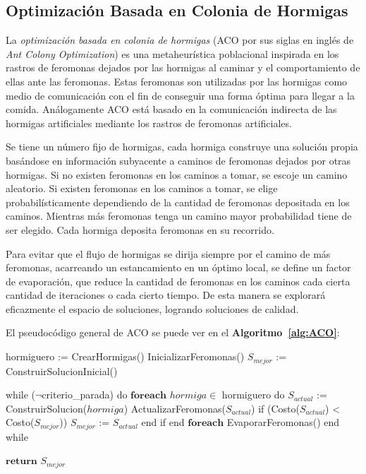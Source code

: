 \subsection{Optimización Basada en Colonia de Hormigas} \label{subsect:aco}

La \emph{optimización basada en colonia de hormigas} (ACO por sus siglas en inglés de \emph{Ant Colony Optimization}) es una metaheurística poblacional inspirada en los rastros de feromonas dejados por las hormigas al caminar y el comportamiento de ellas ante las feromonas. Estas feromonas son utilizadas por las hormigas como medio de comunicación con el fin de conseguir una forma óptima para llegar a la comida. Análogamente ACO está basado en la comunicación indirecta de las hormigas artificiales mediante los rastros de feromonas artificiales. 

Se tiene un número fijo de hormigas, cada hormiga construye una solución propia basándose en información subyacente a caminos de feromonas dejados por otras hormigas. Si no existen feromonas en los caminos a tomar, se escoje un camino aleatorio. Si existen feromonas en los caminos a tomar, se elige probabilísticamente dependiendo de la cantidad de feromonas depositada en los caminos. Mientras más feromonas tenga un camino mayor probabilidad tiene de ser elegido. Cada hormiga deposita feromonas en su recorrido. 

Para evitar que el flujo de hormigas se dirija siempre por el camino de más feromonas, acarreando un es\-tan\-ca\-mien\-to en un óptimo local, se define un factor de evaporación, que reduce la cantidad de  feromonas en los caminos cada cierta cantidad de iteraciones o cada cierto tiempo. De esta manera se explorará eficazmente el espacio de soluciones, logrando soluciones de calidad.

El pseudocódigo general de ACO se puede ver en el \textbf{Algoritmo~\ref{alg:ACO}}:

\begin{code}[includerangemarker=false,frame=single,label=alg:ACO,caption=Pseudocódigo de Optimización basada en Colonia de Hormigas,firstnumber=100, mathescape]
hormiguero := CrearHormigas()
InicializarFeromonas()
$S_{mejor}$ := ConstruirSolucionInicial()

while ($\neg$criterio_parada) do
	$\textbf{foreach}$ $hormiga \in$ hormiguero do
		$S_{actual}$ := ConstruirSolucion($hormiga$)
		ActualizarFeromonas($S_{actual}$)
		if (Costo($S_{actual}$) < Costo($S_{mejor}$))
			$S_{mejor}$ := $S_{actual}$
		end if
	end $\textbf{foreach}$	
	EvaporarFeromonas()
end while

$\textbf{return}$ $S_{mejor}$
\end{code}

